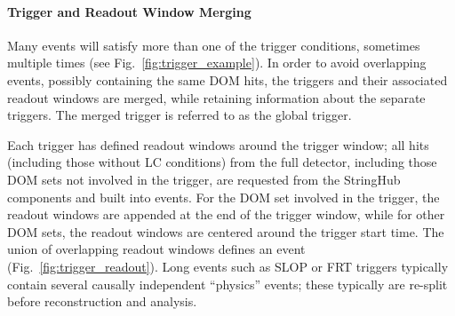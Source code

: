 \paragraph{Trigger and Readout Window Merging}

Many events will satisfy more than one of the trigger conditions,
sometimes multiple times (see Fig.~\ref{fig:trigger_example}).  In order to
avoid overlapping events, possibly containing the same DOM hits, the
triggers and their associated readout windows are merged, while retaining
information about the separate triggers.  The merged trigger is referred to
as the global trigger.   

Each trigger has defined readout windows around the trigger window;
all hits (including those without LC conditions) from the full detector,
including those DOM sets not involved in the trigger, are requested from
the StringHub components and built into events.  For the DOM set involved
in the trigger, the readout windows are appended at the end of the trigger
window, while for other DOM sets, the readout windows are centered around
the trigger start time.  The union of overlapping readout windows defines
an event (Fig.~\ref{fig:trigger_readout}).  Long events such as SLOP or FRT
triggers typically contain several causally independent ``physics'' events;
these typically are re-split before reconstruction and analysis.

